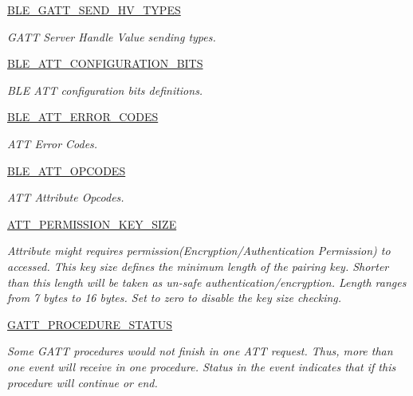\begin{DoxyCompactItemize}
\hyperlink{group___b_l_e___g_a_t_t___s_e_n_d___h_v___t_y_p_e_s}{B\+L\+E\+\_\+\+G\+A\+T\+T\+\_\+\+S\+E\+N\+D\+\_\+\+H\+V\+\_\+\+T\+Y\+P\+ES}
\begin{DoxyCompactList}\small\item\em G\+A\+TT Server Handle Value sending types. \end{DoxyCompactList}\item 
\hyperlink{group___b_l_e___a_t_t___c_o_n_f_i_g_u_r_a_t_i_o_n___b_i_t_s}{B\+L\+E\+\_\+\+A\+T\+T\+\_\+\+C\+O\+N\+F\+I\+G\+U\+R\+A\+T\+I\+O\+N\+\_\+\+B\+I\+TS}
\begin{DoxyCompactList}\small\item\em B\+LE A\+TT configuration bits definitions. \end{DoxyCompactList}\item 
\hyperlink{group___b_l_e___a_t_t___e_r_r_o_r___c_o_d_e_s}{B\+L\+E\+\_\+\+A\+T\+T\+\_\+\+E\+R\+R\+O\+R\+\_\+\+C\+O\+D\+ES}
\begin{DoxyCompactList}\small\item\em A\+TT Error Codes. \end{DoxyCompactList}\item 
\hyperlink{group___b_l_e___a_t_t___o_p_c_o_d_e_s}{B\+L\+E\+\_\+\+A\+T\+T\+\_\+\+O\+P\+C\+O\+D\+ES}
\begin{DoxyCompactList}\small\item\em A\+TT Attribute Opcodes. \end{DoxyCompactList}\item 
\hyperlink{group___a_t_t___p_e_r_m_i_s_s_i_o_n___k_e_y___s_i_z_e}{A\+T\+T\+\_\+\+P\+E\+R\+M\+I\+S\+S\+I\+O\+N\+\_\+\+K\+E\+Y\+\_\+\+S\+I\+ZE}
\begin{DoxyCompactList}\small\item\em Attribute might requires permission(Encryption/\+Authentication Permission) to accessed. This key size defines the minimum length of the pairing key. Shorter than this length will be taken as un-\/safe authentication/encryption. Length ranges from 7 bytes to 16 bytes. Set to zero to disable the key size checking. \end{DoxyCompactList}\item 
\hyperlink{group___g_a_t_t___p_r_o_c_e_d_u_r_e___s_t_a_t_u_s}{G\+A\+T\+T\+\_\+\+P\+R\+O\+C\+E\+D\+U\+R\+E\+\_\+\+S\+T\+A\+T\+US}
\begin{DoxyCompactList}\small\item\em Some G\+A\+TT procedures would not finish in one A\+TT request. Thus, more than one event will receive in one procedure. Status in the event indicates that if this procedure will continue or end. \end{DoxyCompactList}\end{DoxyCompactItemize}
